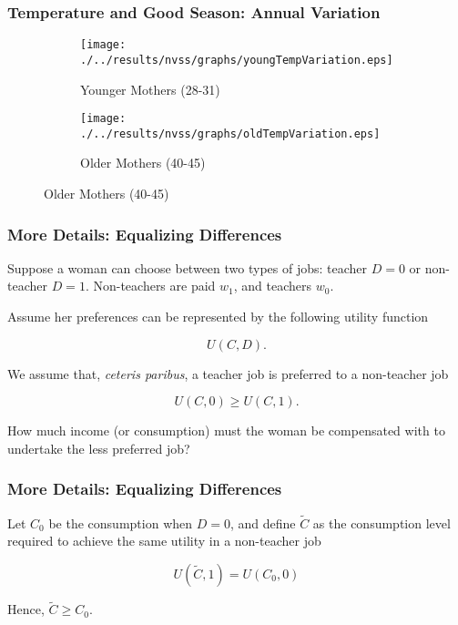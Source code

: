 \documentclass[10pt,letterpaper,subeqn]{beamer}
\begin{document}
\begin{frame}
\frametitle{Temperature and Good Season: Annual Variation}
\begin{figure}[htpb!]
\begin{center}
\label{fig:tempUSA}
\begin{subfigure}{.5\textwidth}
  \centering
  \texttt{[image: ./../results/nvss/graphs/youngTempVariation.eps]}
  \caption{Younger Mothers (28-31)}
  \label{fig:tempUSAYoung}
\end{subfigure}%
\begin{subfigure}{.5\textwidth}
  \centering
  \texttt{[image: ./../results/nvss/graphs/oldTempVariation.eps]}
  \caption{Older Mothers (40-45)}
  \label{fig:tempUSAOld}
\end{subfigure}
\end{center}
\end{figure}

\vspace{8mm}
\hyperlink{weather}{}
\end{frame}


\begin{frame}
  \frametitle{More Details: Equalizing Differences}
  Suppose a woman can choose between two types of jobs: teacher $D=0$ or non-teacher $D=1$. Non-teachers are paid $w_1$, and teachers $w_0$.
  \vspace{2mm}
  
  Assume her preferences can be represented by the following utility function

  \[
    U(C,D).
  \]

  We assume that, \emph{ceteris paribus}, a teacher job is preferred to a non-teacher job

  \[
    U(C,0) \geq U(C,1).
  \]

  How much income (or consumption) must the woman be compensated with to undertake the less preferred job?
\end{frame}

\begin{frame}
  \frametitle{More Details: Equalizing Differences}
  Let $C_0$ be the consumption when $D=0$, and define $\widetilde{C}$ as the consumption level required to achieve the same utility in a non-teacher job

  \[
    U(\widetilde{C},1) = U(C_0,0)
  \]

  Hence, $\widetilde{C} \geq C_0$.
\end{frame}
\end{document}
